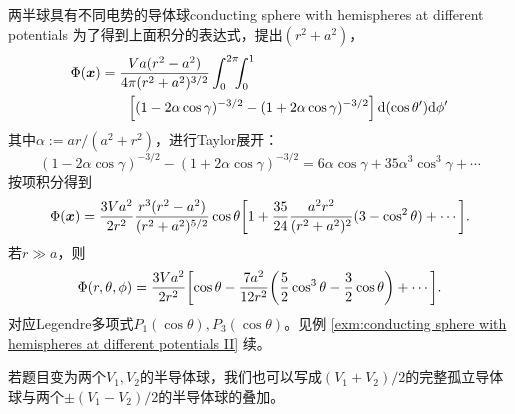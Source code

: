 \begin{example}{两半球具有不同电势的导体球}{conducting sphere with hemispheres at different potentials}
    为了得到上面积分的表达式，提出$(r^2+a^2)$，
    \begin{align*}
        \Phi(\bm x)&=\frac{Va(r^2-a^2)}{4\pi(r^2+a^2)^{3/2}}\int_0^{2\pi}\bs5\int_0^1\\
        &\qquad\Bigl[(1-2\alpha\cos\gamma)^{-3/2}-(1+2\alpha\cos\gamma)^{-3/2}\Bigr]\d(\cos\theta')\nd\phi'
    \end{align*}
    其中$\alpha:=ar/(a^2+r^2)$，进行Taylor展开：
    \[
        (1-2\alpha\cos\gamma)^{-3/2}-(1+2\alpha\cos\gamma)^{-3/2}=6\alpha\cos\gamma+35\alpha^3\cos^3\gamma+\cdots
    \]
    按项积分得到
    \[
        \Phi(\bm x)=\frac{3Va^2}{2r^2}\frac{r^3(r^2-a^2)}{(r^2+a^2)^{5/2}}\cos\theta\biggfkh{1+\frac{35}{24}\frac{a^2r^2}{(r^2+a^2)^2}(3-\cos^2\theta)+\cdots}.
    \]
    若$r\gg a$，则
    \begin{equation}
        \Phi(r,\theta,\phi)=\frac{3Va^2}{2r^2}\biggfkh{\cos\theta-\frac{7a^2}{12r^2}\biggkh{\frac52\cos^3\theta-\frac32\cos\theta}+\cdots}.
    \end{equation}
    对应Legendre多项式$P_1(\cos\theta),P_3(\cos\theta)$。见例 \ref{exm:conducting sphere with hemispheres at different potentials II} 续。
\end{example}
若题目变为两个$V_1,V_2$的半导体球，我们也可以写成$(V_1+V_2)/2$的完整孤立导体球与两个$\pm(V_1-V_2)/2$的半导体球的叠加。
